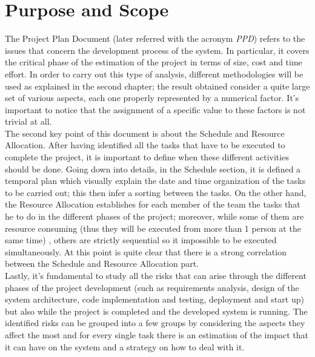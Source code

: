 \documentclass[11pt,a4paper]{report}
\begin{document}
\section{Purpose and Scope}
The Project Plan Document (later referred with the acronym \textit{PPD}) refers to the issues that concern the development process of the system. In particular, it covers the critical phase of the estimation of the project in terms of size, cost and time effort. In order to carry out this type of analysis, different methodologies will be used as explained in the second chapter; the result obtained consider a quite large set of various aspects, each one properly represented by a numerical factor. It's important to notice that the assignment of a specific value to these factors is not trivial at all.\\
The second key point of this document is about the Schedule and Resource Allocation. After having identified all the tasks that have to be executed to complete the project, it is important to define when these different activities should be done. Going down into details, in the Schedule section, it is defined a temporal plan which visually explain the date and time organization of the tasks to be carried out; this then infer a sorting between the tasks. On the other hand, the Resource Allocation establishes for each member of the team the tasks that he to do in the different phases of the project; moreover, while some of them are resource consuming (thus they will be executed from more than 1 person at the same time) , others are strictly sequential so it impossible to be executed simultaneously. At this point is quite clear that there is a strong correlation between the Schedule and Resource Allocation part.\\
Lastly, it's fundamental to study all the risks that can arise through the different phases of the project development (such as requirements analysis, design of the system architecture, code implementation and testing, deployment and start up) but also while the project is completed and the developed system is running. The identified risks can be grouped into a few groups by considering the aspects they affect the most and for every single task there is an estimation of the impact that it can have on the system and a strategy on how to deal with it. 
\end{document}
